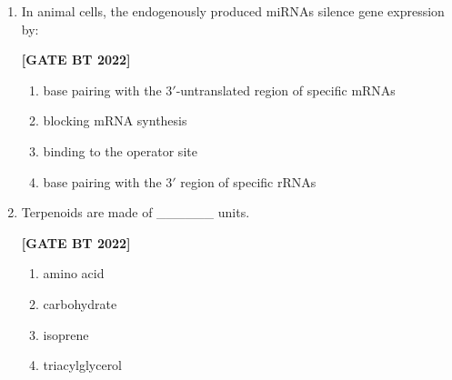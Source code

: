 \documentclass[12pt]{article}
\begin{document}
\begin{enumerate}[leftmargin=2.5em, label=\textbf{Q.\arabic*}., itemsep=2em, resume]
\noindent \textbf{[GATE BT 2022]}
\[
\begin{array}{ll}
\text{Column I} & \text{Column II} \\
P. \ \text{Lysosome} & 1. \ \text{Digestion of macromolecules} \\
Q. \ \text{Peroxisome} & 2. \ \text{Detoxification of harmful compounds} \\
R. \ \text{Glyoxysome} & 3. \ \text{Conversion of fatty acids to sugar} \\
S. \ \text{Cytoskeleton} & 4. \ \text{Involvement in cell motility}
\end{array}
\]
\begin{multicols}{2}
\begin{enumerate}
    \item P-1, Q-2, R-3, S-4
    \item P-2, Q-1, R-3, S-4
    \item P-3, Q-1, R-2, S-4
    \item P-4, Q-3, R-1, S-2
\end{enumerate}
\end{multicols}

\item In animal cells, the endogenously produced miRNAs silence gene expression by:

\noindent \textbf{[GATE BT 2022]}
\begin{multicols}{2}
\begin{enumerate}
    \item base pairing with the 3$'$-untranslated region of specific mRNAs
    \item blocking mRNA synthesis
    \item binding to the operator site
    \item base pairing with the 3$'$ region of specific rRNAs
\end{enumerate}
\end{multicols}

\item Terpenoids are made of \_\_\_\_\_\_ units.

\noindent \textbf{[GATE BT 2022]}
\begin{multicols}{2}
\begin{enumerate}
    \item amino acid
    \item carbohydrate
    \item isoprene
    \item triacylglycerol
\end{enumerate}
\end{multicols}


\end{enumerate}
\end{document}
